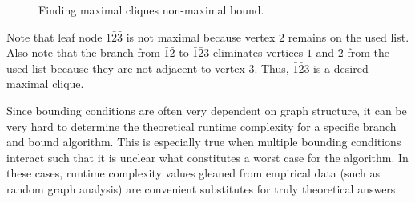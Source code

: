 \begin{figure}[H]
  \centering
  \caption{Finding maximal cliques non-maximal bound.}
  \label{fig:boundnonmax}
\end{figure}

Note that leaf node \(1\bar{2}\bar{3}\) is not maximal because vertex \(2\) remains on the used list.  Also note
that the branch from \(\bar{1}\bar{2}\) to \(\bar{1}\bar{2}3\) eliminates vertices \(1\) and \(2\) from the used
list because they are not adjacent to vertex \(3\).  Thus, \(\bar{1}\bar{2}3\) is a desired maximal clique.

Since bounding conditions are often very dependent on graph structure, it can be very hard to determine the
theoretical runtime complexity for a specific branch and bound algorithm.  This is especially true when multiple
bounding conditions interact such that it is unclear what constitutes a worst case for the algorithm.  In these
cases, runtime complexity values gleaned from empirical data (such as random graph analysis) are convenient
substitutes for truly theoretical answers.
